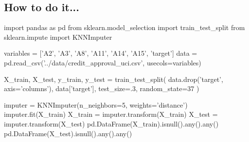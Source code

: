 \subsection{How to do it...}
\begin{pyc}
import pandas as pd
from sklearn.model_selection import train_test_split
from sklearn.impute import KNNImputer

variables = ['A2', 'A3', 'A8', 'A11', 'A14', 'A15', 'target']
data = pd.read_csv('../data/credit_approval_uci.csv',
                    usecols=variables)

X_train, X_test, y_train, y_test = train_test_split(
    data.drop('target', axis='columns'),
    data['target'], test_size=.3, random_state=37
)

imputer = KNNImputer(n_neighbors=5, weights='distance')
imputer.fit(X_train)
X_train = imputer.transform(X_train)
X_test = imputer.transform(X_test)
pd.DataFrame(X_train).isnull().any().any()
pd.DataFrame(X_test).isnull().any().any()
\end{pyc}